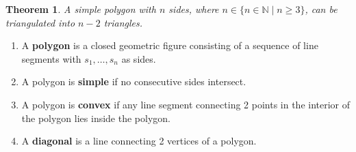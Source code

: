 \documentclass[letterpaper, 12pt]{article}
\newtheorem{theorem}{Theorem}[section]
\newenvironment{definition}[1][Definition]{\begin{trivlist}
\item[\hskip \labelsep {\bfseries #1}]}{\end{trivlist}}
\newcommand{\keyword}[1]{\textbf{#1}}
\newcommand{\N}{\mathbb{N}}
\newcommand{\0}{\emptyset}
\begin{document}
    \begin{theorem}
        A simple polygon with $n$ sides, where $n \in \{n \in \N \mid n \ge 3\}$, can be 
        triangulated into $n - 2$ triangles.
    \end{theorem}
    \begin{definition} \hfill
        \begin{enumerate}
            \item A \keyword{polygon} is a closed geometric figure consisting of a sequence of 
            line segments with $s_1, \dots, s_n$ as sides.
            \item A polygon is \keyword{simple} if no consecutive sides intersect.
            \item A polygon is \keyword{convex} if any line segment connecting 2 points in the 
            interior of the polygon lies inside the polygon.
            \item A \keyword{diagonal} is a line connecting 2 vertices of a polygon.
        \end{enumerate}
    \end{definition}
\end{document}

